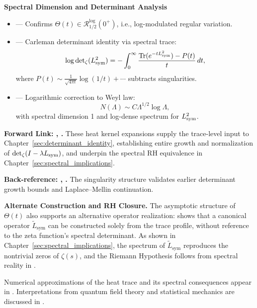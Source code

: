 \textbf{Spectral Dimension and Determinant Analysis}
\begin{itemize}
  \item {} — Confirms \( \Theta(t) \in \mathcal{R}_{1/2}^{\log}(0^+) \), i.e., log-modulated regular variation.
  \item {} — Carleman determinant identity via spectral trace:
  \[
  \log \det\nolimits_{\zeta}(L_{\mathrm{sym}}^2) = -\int_0^\infty \frac{\operatorname{Tr}(e^{-t L_{\mathrm{sym}}^2}) - P(t)}{t} \, dt,
  \]
  where \( P(t) \sim \frac{1}{\sqrt{4\pi t}} \log(1/t) + \cdots \) subtracts singularities.
  \item {} — Logarithmic correction to Weyl law:
  \[
  N(\Lambda) \sim C \Lambda^{1/2} \log \Lambda,
  \]
  with spectral dimension 1 and log-dense spectrum for \( L_{\mathrm{sym}}^2 \).
\end{itemize}

\medskip

\noindent\textbf{Forward Link: , .}  
These heat kernel expansions supply the trace-level input to Chapter~\ref{sec:determinant_identity}, establishing entire growth and normalization of \( \det\nolimits_{\zeta}(I - \lambda L_{\mathrm{sym}}) \), and underpin the spectral RH equivalence in Chapter~\ref{sec:spectral_implications}.

\medskip

\noindent\textbf{Back-reference: , .}  
The singularity structure validates earlier determinant growth bounds and Laplace–Mellin continuation.

\medskip

\noindent\textbf{Alternate Construction and RH Closure.}  
The asymptotic structure of \( \Theta(t) \) also supports an alternative operator realization:  shows that a canonical operator \( \tilde{L}_{\mathrm{sym}} \) can be constructed solely from the trace profile, without reference to the zeta function’s spectral determinant. As shown in Chapter~\ref{sec:spectral_implications}, the spectrum of \( \tilde{L}_{\mathrm{sym}} \) reproduces the nontrivial zeros of \( \zeta(s) \), and the Riemann Hypothesis follows from spectral reality in .

\medskip

\noindent
Numerical approximations of the heat trace and its spectral consequences appear in . Interpretations from quantum field theory and statistical mechanics are discussed in .
